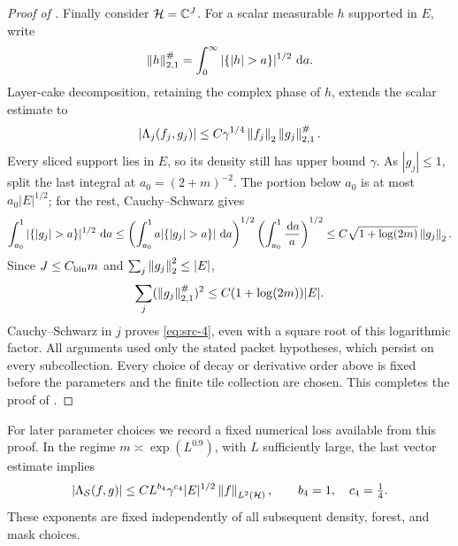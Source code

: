 \begin{proof}[Proof of ]
Finally consider \(\mathcal H=\mathbb C^J\).
For a scalar measurable \(h\)
supported in \(E\), write
\[
 \norm{h}_{2,1}^{\#}
       =\int_0^\infty
             |\{|h|>a\}|^{1/2}\,\dd a.
\]
Layer-cake decomposition, retaining
the complex phase of \(h\), extends
the scalar estimate to
\[
 |\Lambda_j(f_j,g_j)|
       \leq C\gamma^{1/4}\left\|f_j\right\|_2
                                  \left\|g_j\right\|_{2,1}^{\#}.
\]
Every sliced support lies in \(E\),
so its density still has upper bound
\(\gamma\).  As \(|g_j|\leq1\),
split the last integral at
\(a_0=(2+m)^{-2}\).  The portion
below \(a_0\) is at most
\(a_0|E|^{1/2}\); for the rest,
Cauchy--Schwarz gives
\[
 \int_{a_0}^1|\{|g_j|>a\}|^{1/2}\,\dd a
 \leq
 \left(\int_{a_0}^1 a|\{|g_j|>a\}|\,\dd a\right)^{1/2}
 \left(\int_{a_0}^1\frac{\dd a}{a}\right)^{1/2}
 \leq C\sqrt{1+\log(2m)}\norm{g_j}_2.
\]
Since \(J\leq C_{\rm bin}m\) and
\(\sum_j\left\|g_j\right\|_2^2\leq|E|\),
\[
 \sum_j(\left\|g_j\right\|_{2,1}^{\#})^2
       \leq C(1+\log(2m))|E|.
\]
Cauchy--Schwarz in \(j\) proves
\eqref{eq:src-4}, even with a square
root of this logarithmic factor.
All arguments used only the stated
packet hypotheses, which persist
on every subcollection.  Every
choice of decay or derivative order
above is fixed before the parameters
and the finite tile collection are
chosen.  This completes the proof
of .
\end{proof}

For later parameter choices we record a fixed numerical loss
available from this proof.  In the regime
\(m\asymp\exp(L^{0.9})\), with \(L\) sufficiently large,
the last vector estimate implies
\begin{equation}\label{tile:eq-improvement-loss}
 |\Lambda_{\mathcal S}(f,g)|
 \leq C L^{b_4}\gamma^{c_4}|E|^{1/2}
                         \left\|f\right\|_{L^2(\mathcal H)},
 \qquad b_4=1,\quad c_4=\tfrac14.
\end{equation}
These exponents are fixed independently of all subsequent density,
forest, and mask choices.
